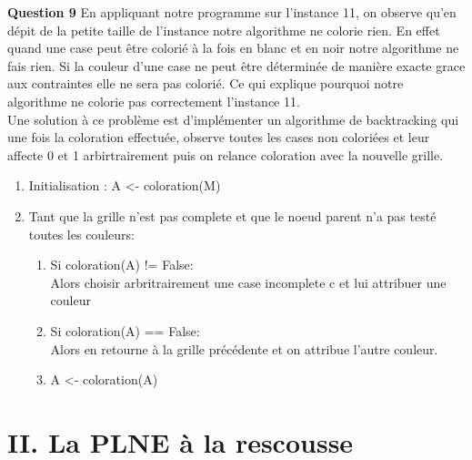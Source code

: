 \documentclass[a4paper]{memoir}
\begin{document}
\textbf{Question 9} En appliquant notre programme sur l'instance 11, on observe qu'en dépit de la petite taille de l'instance notre algorithme ne colorie rien. En effet quand une case peut être colorié à la fois en blanc et en noir notre algorithme ne fais rien. Si la couleur d'une case ne peut être déterminée de manière exacte grace aux contraintes elle ne sera pas colorié. Ce qui explique pourquoi notre algorithme ne colorie pas correctement l'instance 11.
\\
Une solution à ce problème est d'implémenter un algorithme de backtracking qui une fois la coloration effectuée, observe toutes les cases non coloriées et leur affecte 0 et 1 arbirtrairement puis on relance coloration avec la nouvelle grille.
\begin{enumerate}
\item Initialisation : A <- coloration(M) 
\item Tant que la grille n'est pas complete et que le noeud parent n'a pas testé toutes les couleurs:
  \begin{enumerate}
    \item Si coloration(A) != False:\\
      Alors choisir arbritrairement une case incomplete c et lui attribuer une couleur
    \item Si coloration(A) == False:\\
      Alors en retourne à la grille précédente et on attribue l'autre couleur.
    \item  A <- coloration(A)
  \end{enumerate}
\end{enumerate}



 	
 	\section{II. La PLNE à la rescousse}
\end{document}

